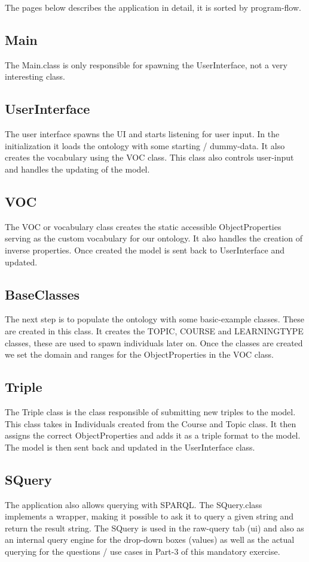 \documentclass{article}
\begin{document}
  \noindent The pages below describes the application in detail, it is sorted by program-flow.


\newpage

\subsection {Main}
The Main.class is only responsible for spawning the UserInterface, not a very interesting class.

\subsection {UserInterface}
The user interface spawns the UI and starts listening for user input. In the initialization it loads the ontology with some
starting / dummy-data. It also creates the vocabulary using the VOC class. This class also controls user-input and handles
the updating of the model.

\subsection {VOC}
The VOC or vocabulary class creates the static accessible ObjectProperties serving as the custom vocabulary for our ontology.
It also handles the creation of inverse properties. Once created the model is sent back to UserInterface and updated.

\subsection {BaseClasses}
The next step is to populate the ontology with some basic-example classes. These are created in this class. It creates the TOPIC, COURSE and LEARNINGTYPE
classes, these are used to spawn individuals later on. Once the classes are created we set the domain and ranges for the ObjectProperties in the VOC class.

\subsection {Triple}
The Triple class is the class responsible of submitting new triples to the model. This class takes in Individuals created from the Course and Topic class.
It then assigns the correct ObjectProperties and adds it as a triple format to the model. The model is then sent back and updated in the UserInterface class.

\subsection {SQuery}
The application also allows querying with SPARQL. The SQuery.class implements a wrapper, making it possible to ask it to query a given string
and return the result string. The SQuery is used in the raw-query tab (ui) and also as an internal query engine for the drop-down boxes (values) as
well as the actual querying for the questions / use cases in Part-3 of this mandatory exercise.
\end{document}
